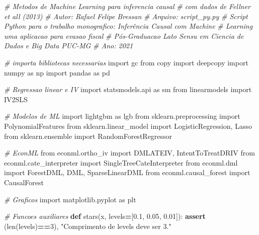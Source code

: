 \documentclass[
]{article}
\newenvironment{Shaded}{\begin{snugshade}}{\end{snugshade}}
\newcommand{\BuiltInTok}[1]{#1}
\newcommand{\CommentTok}[1]{\textcolor[rgb]{0.56,0.35,0.01}{\textit{#1}}}
\newcommand{\ControlFlowTok}[1]{\textcolor[rgb]{0.13,0.29,0.53}{\textbf{#1}}}
\newcommand{\DecValTok}[1]{\textcolor[rgb]{0.00,0.00,0.81}{#1}}
\newcommand{\FloatTok}[1]{\textcolor[rgb]{0.00,0.00,0.81}{#1}}
\newcommand{\ImportTok}[1]{#1}
\newcommand{\KeywordTok}[1]{\textcolor[rgb]{0.13,0.29,0.53}{\textbf{#1}}}
\newcommand{\NormalTok}[1]{#1}
\newcommand{\OperatorTok}[1]{\textcolor[rgb]{0.81,0.36,0.00}{\textbf{#1}}}
\newcommand{\StringTok}[1]{\textcolor[rgb]{0.31,0.60,0.02}{#1}}
\begin{document}
\begin{Shaded}
\begin{Highlighting}[]
\CommentTok{# Metodos de Machine Learning para inferencia causal}
\CommentTok{# com dados de Fellner et all (2013)}
\CommentTok{# Autor: Rafael Felipe Bressan}
\CommentTok{# Arquivo: script_py.py}
\CommentTok{# Script Python para o trabalho monografico: Inferência Causal com Machine }
\CommentTok{# Learning uma aplicacao para evasao fiscal}
\CommentTok{# Pós-Graduacao Lato Sensu em Ciencia de Dados e Big Data PUC-MG}
\CommentTok{# Ano: 2021}

\CommentTok{# importa bibliotecas necessarias}
\ImportTok{import}\NormalTok{ gc}
\ImportTok{from}\NormalTok{ copy }\ImportTok{import}\NormalTok{ deepcopy}
\ImportTok{import}\NormalTok{ numpy }\ImportTok{as}\NormalTok{ np}
\ImportTok{import}\NormalTok{ pandas }\ImportTok{as}\NormalTok{ pd }

\CommentTok{# Regressao linear e IV}
\ImportTok{import}\NormalTok{ statsmodels.api }\ImportTok{as}\NormalTok{ sm}
\ImportTok{from}\NormalTok{ linearmodels }\ImportTok{import}\NormalTok{ IV2SLS}

\CommentTok{# Modelos de ML}
\ImportTok{import}\NormalTok{ lightgbm }\ImportTok{as}\NormalTok{ lgb }
\ImportTok{from}\NormalTok{ sklearn.preprocessing }\ImportTok{import}\NormalTok{ PolynomialFeatures}
\ImportTok{from}\NormalTok{ sklearn.linear_model }\ImportTok{import}\NormalTok{ LogisticRegression, Lasso}
\ImportTok{from}\NormalTok{ sklearn.ensemble }\ImportTok{import}\NormalTok{ RandomForestRegressor}

\CommentTok{# EconML}
\ImportTok{from}\NormalTok{ econml.ortho_iv }\ImportTok{import}\NormalTok{ DMLATEIV, IntentToTreatDRIV}
\ImportTok{from}\NormalTok{ econml.cate_interpreter }\ImportTok{import}\NormalTok{ SingleTreeCateInterpreter}
\ImportTok{from}\NormalTok{ econml.dml }\ImportTok{import}\NormalTok{ ForestDML, DML, SparseLinearDML}
\ImportTok{from}\NormalTok{ econml.causal_forest }\ImportTok{import}\NormalTok{ CausalForest}

\CommentTok{# Graficos}
\ImportTok{import}\NormalTok{ matplotlib.pyplot }\ImportTok{as}\NormalTok{ plt}

\CommentTok{# Funcoes auxiliares}
\KeywordTok{def}\NormalTok{ stars(x, levels}\OperatorTok{=}\NormalTok{[}\FloatTok{0.1}\NormalTok{, }\FloatTok{0.05}\NormalTok{, }\FloatTok{0.01}\NormalTok{]):}
    \ControlFlowTok{assert}\NormalTok{ (}\BuiltInTok{len}\NormalTok{(levels)}\OperatorTok{==}\DecValTok{3}\NormalTok{), }\StringTok{"Comprimento de levels deve ser 3."}
    

\end{Highlighting}
\end{Shaded}
\end{document}
